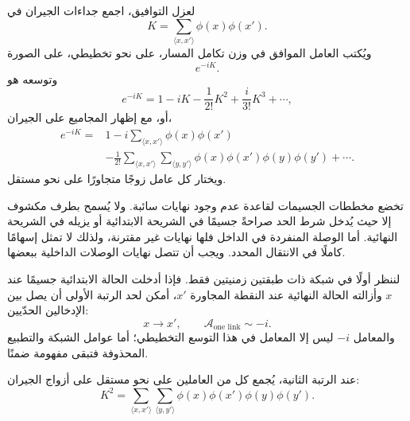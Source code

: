 لعزل التوافيق، اجمع جداءات الجيران في
\begin{equation}
K=\sum_{\langle x,x'\rangle}\phi(x)\phi(x').
\end{equation}
ويُكتب العامل الموافق في وزن تكامل المسار، على نحو تخطيطي، على الصورة
\begin{equation}
e^{-iK}.
\end{equation}
وتوسعه هو
\begin{equation}
e^{-iK}
=1-iK-\frac{1}{2!}K^2+\frac{i}{3!}K^3+\cdots,
\end{equation}
أو، مع إظهار المجاميع على الجيران،
\begin{align}
e^{-iK}
={}&1
-i\sum_{\langle x,x'\rangle}\phi(x)\phi(x')
\nonumber\\
&-\frac{1}{2!}
\sum_{\langle x,x'\rangle}
\sum_{\langle y,y'\rangle}
\phi(x)\phi(x')\phi(y)\phi(y')
+\cdots .
\end{align}
ويختار كل عامل زوجًا متجاورًا على نحو مستقل.

تخضع مخططات الجسيمات لقاعدة عدم وجود نهايات سائبة. ولا يُسمح بطرف مكشوف إلا حيث يُدخل شرط الحد صراحةً جسيمًا في الشريحة الابتدائية أو يزيله في الشريحة النهائية. أما الوصلة المنفردة في الداخل فلها نهايات غير مقترنة، ولذلك لا تمثل إسهامًا كاملًا في الانتقال المحدد. ويجب أن تتصل نهايات الوصلات الداخلية ببعضها.

لننظر أولًا في شبكة ذات طبقتين زمنيتين فقط. فإذا أدخلت الحالة الابتدائية جسيمًا عند \(x\) وأزالته الحالة النهائية عند النقطة المجاورة \(x'\)، أمكن لحد الرتبة الأولى أن يصل بين الإدخالين الحدّيين:
\begin{equation}
x\longrightarrow x',
\qquad
\mathcal{A}_{\text{one link}}\sim -i.
\end{equation}
والمعامل \(-i\) ليس إلا المعامل في هذا التوسع التخطيطي؛ أما عوامل الشبكة والتطبيع المحذوفة فتبقى مفهومة ضمنًا.

\begin{classroomqa}
\end{classroomqa}

عند الرتبة الثانية، يُجمع كل من العاملين على نحو مستقل على أزواج الجيران:
\begin{equation}
K^2
=
\sum_{\langle x,x'\rangle}
\sum_{\langle y,y'\rangle}
\phi(x)\phi(x')\phi(y)\phi(y').
\end{equation}

